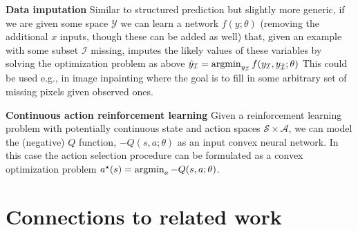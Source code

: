 \textbf{Data imputation}  Similar to structured prediction
but slightly more generic, if we are given some space $\mathcal{Y}$
we can learn a network $f(y;\theta)$ (removing the additional $x$
inputs, though these can be added as well) that, given an example with
some subset $\mathcal{I}$ missing, imputes the likely values of these variables
by solving the optimization problem as above $\hat{y}_\mathcal{I} = \operatorname*{argmin}_
{y_\mathcal{I}} f(y_{\mathcal{I}}, y_{\bar {\mathcal{I}}}; \theta)$
This could be used e.g., in image inpainting
where the goal is to fill in some arbitrary set of missing pixels given observed
ones.

\textbf{Continuous action reinforcement learning}
Given a reinforcement learning problem with potentially continuous
state and action spaces $\mathcal
{S} \times \mathcal{A}$,
we can model the (negative) $Q$ function,
$-Q(s,a;\theta)$ as an input convex neural network.  In this case the action
selection procedure can be formulated as a convex optimization problem
$a^\star(s) = \operatorname*{argmin}_a -Q(s,a;\theta)$.


\section{Connections to related work}

